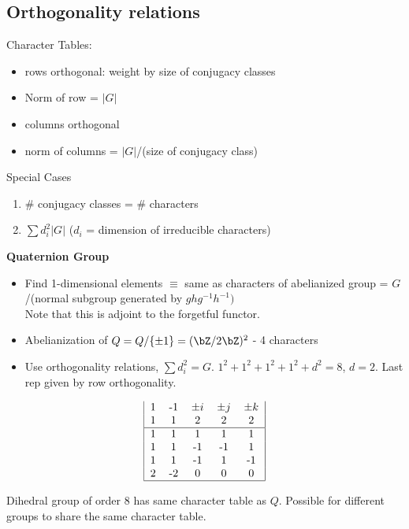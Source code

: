 
\subsection{Orthogonality relations} 

Character Tables: 
\begin{itemize}
    \item rows orthogonal: weight by size of conjugacy classes
    \item Norm of row = $|G|$ 
    \item columns orthogonal 
    \item norm of columns = $|G|$/(size of conjugacy class)
\end{itemize}

\noindent
Special Cases 
\begin{enumerate}
    \item \# conjugacy classes = \# characters 
    \item $\sum d_i^2 |G|$ ($d_i$ = dimension of irreducible characters) 
\end{enumerate}

\noindent
\textbf{Quaternion Group} 
\begin{itemize}
    \item Find 1-dimensional elements $\equiv$ same as characters of abelianized group = $G$/(normal subgroup generated by $ghg^{-1}h^{-1})$ \\
    Note that this is adjoint to the forgetful functor. 
    \item Abelianization of $Q = Q/\{\pm 1\} = (\bZ/2\bZ)^2$ - 4 characters 
    \item Use orthogonality relations, $\sum d_i^2 = G$. $1^2 + 1^2 + 1^2 + 1^2 + d^2=8$, $d=2$. Last rep given by row orthogonality. 
\end{itemize}

\[\begin{tabular}{| c c c c c |}
    1 & -1 & $\pm i$ & $\pm j$ & $\pm k$ \\ 
    1 & 1 & 2 & 2 & 2 \\ \hline 
    1 & 1 & 1 & 1 & 1  \\ 
    1 & 1 & -1 & -1 & 1 \\ 
    1 & 1 & -1 & 1 & -1 \\ 
    2 & -2 & 0 & 0 & 0 \\ \hline
\end{tabular} \]

\noindent
Dihedral group of order 8 has same character table as $Q$. Possible for different groups to share the same character table. 

